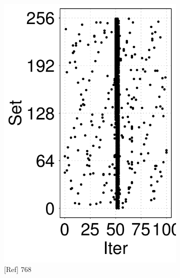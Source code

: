 \begin{figure}[t]
\begin{subfigure}[b]{.24\linewidth}
        \includegraphics[width=\linewidth]{figure/plot/reference/fig14-pmdk-kv-memory-pattern-768.tikz.pdf}
        \caption{[Ref] 768}
        \label{fig:14:ref:pmdk-kv-memory-pattern3}
    \end{subfigure}
    \hfill
    \begin{subfigure}[b]{.24\linewidth}
        \centering

\end{subfigure}
\end{figure}
